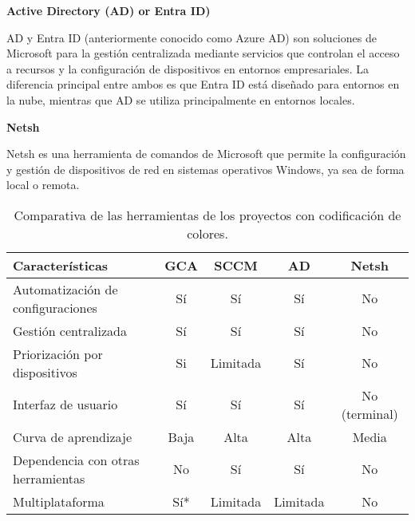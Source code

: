 \textbf{Active Directory (AD) or Entra ID)}

AD\cite{microsoftADDS} y Entra ID\cite{microsoftEntra} (anteriormente conocido como Azure AD) son soluciones de Microsoft
para la gestión centralizada mediante servicios que controlan el acceso a recursos y la configuración de dispositivos
en entornos empresariales.
La diferencia principal entre ambos es que Entra ID está diseñado para entornos en la nube, mientras que AD se utiliza
principalmente en entornos locales.

\textbf{Netsh}

Netsh\cite{microsoftNetsh} es una herramienta de comandos de Microsoft que permite la configuración y gestión
de dispositivos de red en sistemas operativos Windows, ya sea de forma local o remota.

 \begin{table}[H]
        \centering
        \begin{tabular}{lcccc}
            \toprule
            \textbf{Características} & \textbf{GCA} & \textbf{SCCM} & \textbf{AD} & \textbf{Netsh} \\
            \midrule
            Automatización de configuraciones & \cellcolor{verde}Sí & \cellcolor{verde}Sí & \cellcolor{verde}Sí & \cellcolor{rojo}No \\
            Gestión centralizada              & \cellcolor{verde}Sí & \cellcolor{verde}Sí & \cellcolor{verde}Sí & \cellcolor{rojo}No \\
            Priorización por dispositivos     & \cellcolor{verde}Si & \cellcolor{amarillo}Limitada & \cellcolor{verde}Sí & \cellcolor{rojo}No \\
            Interfaz de usuario               & \cellcolor{verde}Sí & \cellcolor{verde}Sí & \cellcolor{verde}Sí & \cellcolor{rojo}No (terminal) \\
            Curva de aprendizaje              & \cellcolor{verde}Baja & \cellcolor{rojo}Alta & \cellcolor{rojo}Alta & \cellcolor{amarillo}Media \\
            Dependencia con otras herramientas & \cellcolor{verde}No & \cellcolor{rojo}Sí & \cellcolor{rojo}Sí & \cellcolor{verde}No \\
            Multiplataforma                   & \cellcolor{verde}Sí* & \cellcolor{amarillo}Limitada & \cellcolor{amarillo}Limitada & \cellcolor{rojo}No \\
            \bottomrule
        \end{tabular}
        \caption{Comparativa de las herramientas de los proyectos con codificación de colores.}
        \label{tab:comparativa-herramientas-proyectos}
 \end{table}

